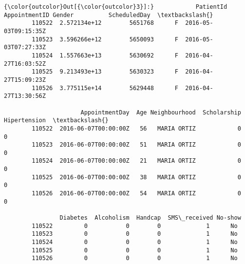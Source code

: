 \documentclass[11pt]{article}
\begin{document}
\begin{Verbatim}[commandchars=\\\{\}]
{\color{outcolor}Out[{\color{outcolor}3}]:}            PatientId  AppointmentID Gender          ScheduledDay  \textbackslash{}
        110522  2.572134e+12        5651768      F  2016-05-03T09:15:35Z   
        110523  3.596266e+12        5650093      F  2016-05-03T07:27:33Z   
        110524  1.557663e+13        5630692      F  2016-04-27T16:03:52Z   
        110525  9.213493e+13        5630323      F  2016-04-27T15:09:23Z   
        110526  3.775115e+14        5629448      F  2016-04-27T13:30:56Z   
        
                      AppointmentDay  Age Neighbourhood  Scholarship  Hipertension  \textbackslash{}
        110522  2016-06-07T00:00:00Z   56   MARIA ORTIZ            0             0   
        110523  2016-06-07T00:00:00Z   51   MARIA ORTIZ            0             0   
        110524  2016-06-07T00:00:00Z   21   MARIA ORTIZ            0             0   
        110525  2016-06-07T00:00:00Z   38   MARIA ORTIZ            0             0   
        110526  2016-06-07T00:00:00Z   54   MARIA ORTIZ            0             0   
        
                Diabetes  Alcoholism  Handcap  SMS\_received No-show  
        110522         0           0        0             1      No  
        110523         0           0        0             1      No  
        110524         0           0        0             1      No  
        110525         0           0        0             1      No  
        110526         0           0        0             1      No  
\end{Verbatim}
            
\end{document}
